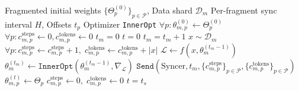 \documentclass[11pt, a4paper, twocolumn, copyright, google]{google}
\begin{document}
\begin{algorithm}[t!] \small
\caption{Decoupled DiLoCo: Learner} \label{alg:learner}
\begin{algorithmic}[1]
\Require Fragmented initial weights $\{\Theta_p^{(0)}\}_{p \in \mathcal{P}}$, Data shard $\mathcal{D}_m$
\Require Per-fragment sync interval $H$, Offsets $t_p$
\Require Optimizer \texttt{InnerOpt}
\State $\forall p: \theta_{m, p}^{(0)} \gets \Theta_p^{(0)}$
\State $\forall p: c^{\text{steps}}_{m, p} \gets 0, c^{\text{tokens}}_{m, p} \gets 0$
\State $t_m = 0$
\State $t = 0$
    \Statex
    \State {}
    \State $t_m = t_m + 1$
    \State $x \sim \mathcal{D}_m$
    \State $\forall p: c^{\text{steps}}_{m, p} \gets c^{\text{steps}}_{m, p} + 1,\; c^{\text{tokens}}_{m, p} \gets c^{\text{tokens}}_{m, p} + |x|$
    \State $\mathcal{L} \gets f(x, \theta_m^{(t_m-1)})$
    \State $\theta_m^{(t_m)} \gets \texttt{InnerOpt}(\theta_m^{(t_m-1)}, \nabla_\mathcal{L})$
    \Statex
    \State {}
    \State $\texttt{Send}(\text{Syncer}, t_m, \{c^{\text{steps}}_{m, p}\}_{p \in \mathcal{P}}, \{c^{\text{tokens}}_{m, p}\}_{p \in \mathcal{P}})$
    \Statex
    \State {}
        \State $\theta_{m,p}^{(t)} \gets \Theta_p$
        \State $c^{\text{steps}}_{m, p} \gets 0,\; c^{\text{tokens}}_{m, p} \gets 0$
        \State $t = t_s$
    \EndFor
\EndWhile
\end{algorithmic}
\end{algorithm}
\end{document}
